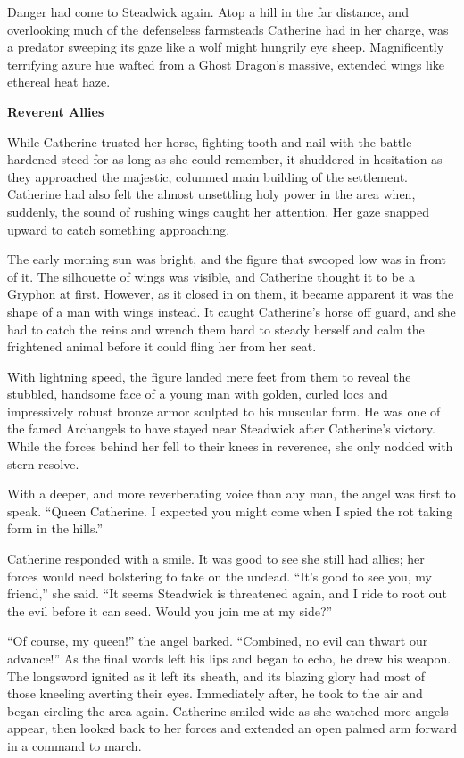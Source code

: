 \begin{multicols*}{2}
Danger had come to Steadwick again. Atop a hill in the far distance, and overlooking much of the defenseless farmsteads Catherine had in her charge, was a predator sweeping its gaze like a wolf might hungrily eye sheep. Magnificently terrifying azure hue wafted from a Ghost Dragon's massive, extended wings like ethereal heat haze.


\textbf{Reverent Allies}

While Catherine trusted her horse, fighting tooth and nail with the battle hardened steed for as long as she could remember, it shuddered in hesitation as they approached the majestic, columned main building of the settlement. Catherine had also felt the almost unsettling holy power in the area when, suddenly, the sound of rushing wings caught her attention. Her gaze snapped upward to catch something approaching. 

The early morning sun was bright, and the figure that swooped low was in front of it. The silhouette of wings was visible, and Catherine thought it to be a Gryphon at first. However, as it closed in on them, it became apparent it was the shape of a man with wings instead. It caught Catherine's horse off guard, and she had to catch the reins and wrench them hard to steady herself and calm the frightened animal before it could fling her from her seat.

With lightning speed, the figure landed mere feet from them to reveal the stubbled, handsome face of a young man with golden, curled locs and impressively robust bronze armor sculpted to his muscular form. He was one of the famed Archangels to have stayed near Steadwick after Catherine's victory. While the forces behind her fell to their knees in reverence, she only nodded with stern resolve.

With a deeper, and more reverberating voice than any man, the angel was first to speak. ``Queen Catherine. I expected you might come when I spied the rot taking form in the hills.''

Catherine responded with a smile. It was good to see she still had allies; her forces would need bolstering to take on the undead. ``It's good to see you, my friend,'' she said. ``It seems Steadwick is threatened again, and I ride to root out the evil before it can seed. Would you join me at my side?''

``Of course, my queen!'' the angel barked. ``Combined, no evil can thwart our advance!'' As the final words left his lips and began to echo, he drew his weapon. The longsword ignited as it left its sheath, and its blazing glory had most of those kneeling averting their eyes. Immediately after, he took to the air and began circling the area again. Catherine smiled wide as she watched more angels appear, then looked back to her forces and extended an open palmed arm forward in a command to march.


\end{multicols*}
